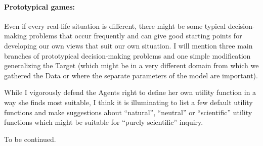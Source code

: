\documentclass{article}
\begin{document}
\paragraph{Prototypical games:}
Even if every real-life situation is different, there might be some typical decision-making problems that occur frequently and can give good starting points for developing our own views that suit our own situation.
I will mention three main branches of prototypical decision-making problems and one simple modification generalizing the Target (which might be in a very different domain from which we gathered the Data or where the separate parameters of the model are important).

While I vigorously defend the Agents right to define her own utility function in a way she finds most suitable, I think it is illuminating to list a few default utility functions and make suggestions about ``natural'', ``neutral'' or ``scientific'' utility functions which might be suitable for ``purely scientific'' inquiry.


{\centering
\vspace{1 cm}
  \Huge To be continued.\par
}


\end{document}
